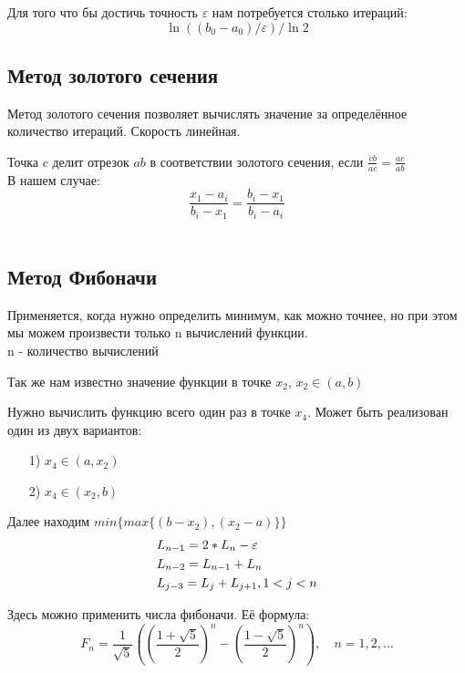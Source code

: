 \documentclass[fleqn]{article}
\begin{document}
Для того что бы достичь точность $\varepsilon$ нам потребуется столько итераций:
$$\ln{((b_0-a_0)/\varepsilon)/\ln{2}}$$

\subsection{Метод золотого сечения}

Метод золотого сечения позволяет вычислять значение за определённое количество итераций. Скорость линейная.

Точка $c$ делит отрезок $ab$ в соответствии золотого сечения, если $\frac{cb}{ac}=\frac{ac}{ab}$\\

В нашем случае:\\
$$\frac{x_1-a_i}{b_i-x_1}=\frac{b_i-x_1}{b_i-a_i}$$\\

\subsection{Метод Фибоначи}

Применяется, когда нужно определить минимум, как можно точнее, но при этом мы можем произвести только n вычислений функции.\\

n - количество вычислений

Так же нам известно значение функции в точке $x_2$, $x_2\in (a,b)$

Нужно вычислить функцию всего один раз в точке $x_4$. Может быть реализован один из двух вариантов:

\begin{itemize}
    \item [1)] $x_4\in (a,x_2)$
    \item [2)] $x_4\in (x_2,b)$
\end{itemize}

Далее находим $min\{max\{(b-x_2), (x_2-a)\}\}$\\

\begin{align*}
    &L_{n-1}=2*L_n-\varepsilon\\
    &L_{n-2}=L_{n-1}+L_n\\
    &L_{j-3}=L_j+L_{j+1},\space 1<j<n
\end{align*}

Здесь можно применить числа фибоначи. Её формула:
$$F_n = \frac{1}{\sqrt{5}}\left(\left(\frac{1+\sqrt{5}}{2}\right)^n-\left(\frac{1-\sqrt{5}}{2}\right)^n\right),\quad n=1,2,\dots$$\\
\end{document}
